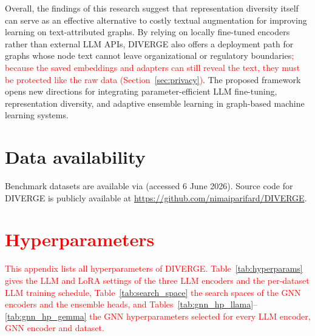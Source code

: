 \documentclass[a4paper,fleqn]{cas-sc}
\newcommand{\revone}[1]{\textcolor{red}{#1}}   %
\begin{document}
Overall, the findings of this research suggest that representation diversity itself can serve as an effective alternative to costly textual augmentation for improving learning on text-attributed graphs. By relying on locally fine-tuned encoders rather than external LLM APIs, DIVERGE also offers a deployment path for graphs whose node text cannot leave organizational or regulatory boundaries\revone{; because the saved embeddings and adapters can still reveal the text, they must be protected like the raw data (Section~\ref{sec:privacy})}. The proposed framework opens new directions for integrating parameter-efficient LLM fine-tuning, representation diversity, and adaptive ensemble learning in graph-based machine learning systems.





\section*{Data availability}
Benchmark datasets are available via \citep{Wu2025} (accessed 6 June 2026).
Source code for DIVERGE is publicly available at \url{https://github.com/nimaiparifard/DIVERGE}.

%
\FloatBarrier





\clearpage
\appendix
\section{\revone{Hyperparameters}}\label{app:hyperparams}

\revone{This appendix lists all hyperparameters of DIVERGE. Table~\ref{tab:hyperparams} gives the LLM and LoRA settings of the three LLM encoders and the per-dataset LLM training schedule, Table~\ref{tab:search_space} the search spaces of the GNN encoders and the ensemble heads, and Tables~\ref{tab:gnn_hp_llama}--\ref{tab:gnn_hp_gemma} the GNN hyperparameters selected for every LLM encoder, GNN encoder and dataset.}
\end{document}
